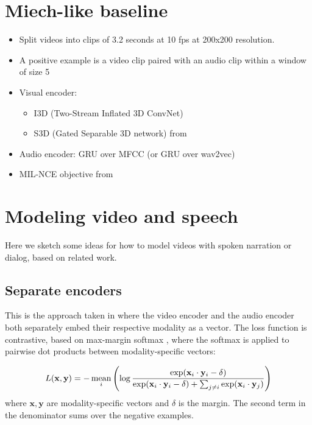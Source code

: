 \appendix

\section{Miech-like baseline}

\begin{itemize}
\item Split videos into clips of 3.2 seconds at 10 fps at 200x200 resolution.
\item A positive example is a video clip paired with an audio clip within a window of size 5
\item Visual encoder:

  \begin{itemize}
  \item I3D (Two-Stream Inflated 3D ConvNet)
  \item S3D (Gated Separable 3D network) from \citet{miech2020end}
\end{itemize}

\item Audio encoder: GRU over MFCC (or GRU over wav2vec)
\item MIL-NCE objective from \citet{miech2020end}
  
\end{itemize}
\section{Modeling video and speech}
Here we sketch some ideas for how to model videos with spoken
narration or dialog, based on related work.

\subsection{Separate encoders}
This is the approach taken in \citet{rouditchenko2020avlnet} where the
video encoder and the audio encoder both separately embed their
respective modality as a vector. The loss function is contrastive,
based on max-margin softmax \citep{ilharco-etal-2019-large}, where the
softmax is applied to pairwise dot products between modality-specific
vectors:

\begin{equation}
  \label{eq:mms}
  L(\mathbf{x}, \mathbf{y}) = - \operatorname*{mean}_i \left(
    \log \frac{\exp(\mathbf{x}_i\cdot \mathbf{y}_i-\delta)}
    { \exp(\mathbf{x}_i\cdot \mathbf{y}_i-\delta) + \sum_{j\neq i}
      \exp(\mathbf{x}_i \cdot \mathbf{y}_j)  }
  \right)
\end{equation}
where $\mathbf{x, y}$ are modality-specific vectors and $\delta$ is the
margin. The second term in the denominator sums over the negative
examples.

